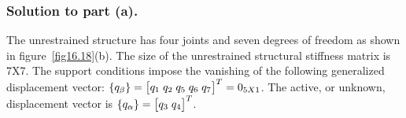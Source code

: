 \documentclass{AeroStructure-ERJohnson}
\begin{document}
\begin{example*}

\subsubsection{Solution to part (a).} The unrestrained structure has four joints and seven degrees of freedom as shown in figure~\ref{fig16.18}(b). The size of the unrestrained structural stiffness matrix is 7X7. The support conditions impose the vanishing of the following generalized displacement vector: $\left\{q_{\beta}\right\}=\left[\begin{array}{@{}l@{\;}l@{\;}l@{\;}l@{\;}l@{}}q_{1} & q_{2} & q_{5} & q_{6} & q_{7}\end{array}\right]^{T}=0_{5X1}$. The active, or unknown, displacement vector is $\left\{q_{\alpha}\right\}=\left[\begin{array}{@{}l@{\;}l@{}}q_{3} & q_{4}\end{array}\right]^{T}$.


\end{example*}
\end{document}
